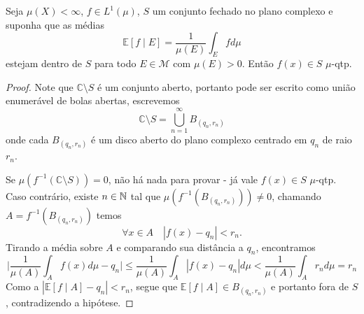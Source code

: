 
\begin{problem}
    \label{prob:l6:2}
    Seja $\mu(X) < \infty$, $f \in L^1(\mu)$, $S$ um conjunto fechado no plano complexo e suponha que as médias
    $$\mathbb{E}[f \mid E] = \frac{1}{\mu(E)} \int_E fd\mu$$
    estejam dentro de $S$ para todo $E \in \mathcal{M}$ com $\mu(E) > 0$. Então $f(x) \in S$ $\mu$-qtp. 
\end{problem}
\begin{proof}
    Note que $\mathbb{C} \setminus S$ é um conjunto aberto, portanto pode ser escrito como união enumerável
    de bolas abertas, escrevemos
    $$\mathbb{C} \setminus S = \bigcup_{n=1}^{\infty} B_{(q_n, r_n)}$$
    onde cada $B_{(q_n,r_n)}$ é um disco aberto do plano complexo centrado em $q_n$ de raio $r_n$. 
    
    Se $\mu(f^{-1}(\mathbb{C} \setminus S)) = 0$, não há nada para provar - já vale $f(x) \in S$ $\mu$-qtp. Caso contrário,
    existe $n \in \mathbb{N}$ tal que $\mu(f^{-1}(B_{(q_n,r_n)})) \neq 0$, chamando $A = f^{-1}(B_{(q_n,r_n)})$ temos
    $$\forall x \in A \quad |f(x) - q_n| < r_n.$$ 
    Tirando a média sobre $A$ e comparando sua distância a $q_n$, encontramos
    $$\bigg | \frac{1}{\mu(A)} \int_A f(x) d\mu - q_n\bigg| \leq \frac{1}{\mu(A)} \int_A |f(x) - q_n| d\mu < \frac{1}{\mu(A)} \int_A r_n d\mu = r_n$$
    Como a $|\mathbb{E}[f \mid A] - q_n| < r_n$, segue que $\mathbb{E}[f \mid A] \in B_{(q_n,r_n)}$ e portanto fora de $S$, contradizendo a hipótese.
\end{proof}


